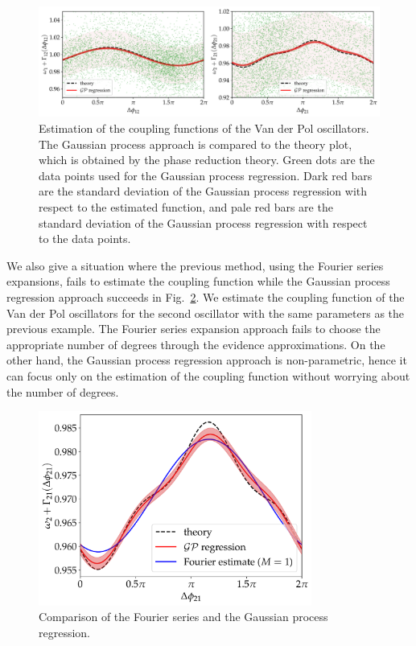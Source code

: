 \begin{figure}[htbp]
    \centering
    \includegraphics[width=\textwidth]{figs/vdp_gp.pdf}
    \caption{Estimation of the coupling functions of the Van der Pol oscillators.
    The Gaussian process approach is compared to the theory plot, which is obtained by the phase reduction theory.
    Green dots are the data points used for the Gaussian process regression.
    Dark red bars are the standard deviation of the Gaussian process regression with respect to the estimated function, and pale red bars are the standard deviation of the Gaussian process regression with respect to the data points.
    }
    \label{fig:vdp_gp}
\end{figure}

We also give a situation where the previous method, using the Fourier series expansions, fails to estimate the coupling function while the Gaussian process regression approach succeeds in Fig.~\ref{fig:gp_fourier_comparison}.
We estimate the coupling function of the Van der Pol oscillators for the second oscillator with the same parameters as the previous example.
The Fourier series expansion approach fails to choose the appropriate number of degrees through the evidence approximations.
On the other hand, the Gaussian process regression approach is non-parametric,
hence it can focus only on the estimation of the coupling function without worrying about the number of degrees.

\begin{figure}[htbp]
    \centering
    \includegraphics[width=0.8\textwidth]{figs/gp_fourier_comparison.pdf}
    \caption{
        Comparison of the Fourier series and the Gaussian process regression.
    }
    \label{fig:gp_fourier_comparison}
\end{figure}

